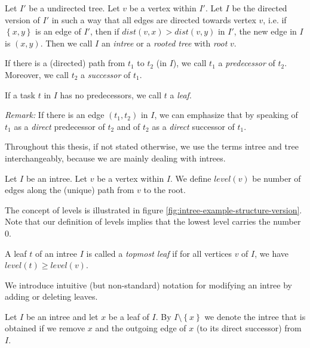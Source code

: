 \begin{definition}[Intree]
  Let $I'$ be a undirected tree. Let $v$ be a vertex within $I'$. Let $I$ be the directed version of $I'$ in such a way that all edges are directed towards vertex $v$, i.e. if $\left\{ x,y \right\}$ is an edge of $I'$, then if $dist(v,x) > dist(v,y)$ in $I'$, the new edge in $I$ is $(x,y)$. Then we call $I$ an \emph{intree} or a \emph{rooted tree} with \emph{root} $v$.

  If there is a (directed) path from $t_1$ to $t_2$ (in $I$), we call $t_1$ a \emph{predecessor} of $t_2$. Moreover, we call $t_2$ a \emph{successor} of $t_1$.

  If a task $t$ in $I$ has no predecessors, we call $t$ a \emph{leaf}.
\end{definition}

\emph{Remark:} If there is an edge $(t_1, t_2)$ in $I$, we can emphasize that by speaking of $t_1$ as a \emph{direct} predecessor of $t_2$ and of $t_2$ as a \emph{direct} successor of $t_1$.

Throughout this thesis, if not stated otherwise, we use the terms intree and tree interchangeably, because we are mainly dealing with intrees.

\begin{definition}[Level]
  Let $I$ be an intree. Let $v$ be a vertex within $I$. We define $level(v)$ be number of edges along the (unique) path from $v$ to the root.
\end{definition}

The concept of levels is illustrated in figure \ref{fig:intree-example-structure-version}. Note that our definition of levels implies that the lowest level carries the number 0.

\begin{definition}
  A leaf $t$ of an intree $I$ is called a \emph{topmost leaf} if for all vertices $v$ of $I$, we have $level(t) \geq level(v)$.
\end{definition}

We introduce intuitive (but non-standard) notation for modifying an intree by adding or deleting leaves.

\begin{definition}
  Let $I$ be an intree and let $x$ be a leaf of $I$.
  By $I\setminus\left\{ x \right\}$ we denote the intree that is obtained if we remove $x$ and the outgoing edge of $x$ (to its direct successor) from $I$.
\end{definition}

